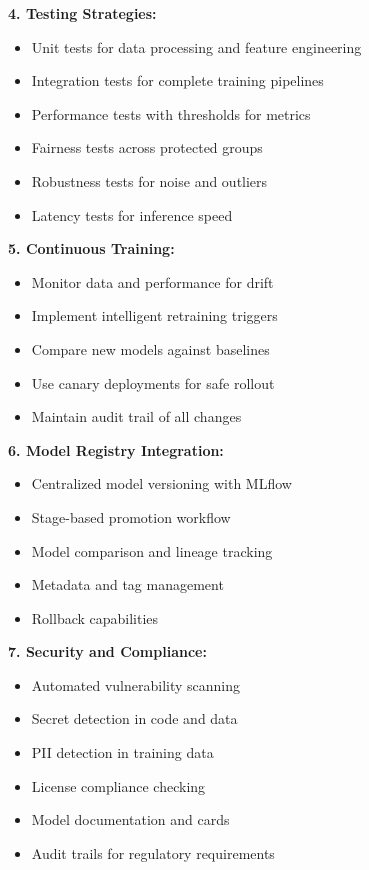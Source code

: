 \textbf{4. Testing Strategies:}
\begin{itemize}
    \item Unit tests for data processing and feature engineering
    \item Integration tests for complete training pipelines
    \item Performance tests with thresholds for metrics
    \item Fairness tests across protected groups
    \item Robustness tests for noise and outliers
    \item Latency tests for inference speed
\end{itemize}

\textbf{5. Continuous Training:}
\begin{itemize}
    \item Monitor data and performance for drift
    \item Implement intelligent retraining triggers
    \item Compare new models against baselines
    \item Use canary deployments for safe rollout
    \item Maintain audit trail of all changes
\end{itemize}

\textbf{6. Model Registry Integration:}
\begin{itemize}
    \item Centralized model versioning with MLflow
    \item Stage-based promotion workflow
    \item Model comparison and lineage tracking
    \item Metadata and tag management
    \item Rollback capabilities
\end{itemize}

\textbf{7. Security and Compliance:}
\begin{itemize}
    \item Automated vulnerability scanning
    \item Secret detection in code and data
    \item PII detection in training data
    \item License compliance checking
    \item Model documentation and cards
    \item Audit trails for regulatory requirements
\end{itemize}


